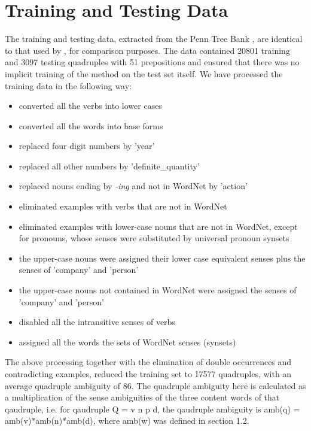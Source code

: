 \section{Training and Testing Data}

The training and testing data, extracted from the Penn Tree Bank \cite{MA93}, are identical to that used by \cite{RRR94}, \cite{CandB95} for comparison purposes. The data contained 20801 training and 3097 testing quadruples with 51 prepositions and ensured that there was no implicit training of the method on the test set itself. We have processed the training data in the following way:

\begin{itemize}
\item 
converted all the verbs into lower cases

\item 
converted all the words into base forms

\item 
replaced four digit numbers by {\sf 'year'}

\item 
replaced all other numbers by {\sf 'definite\_quantity'}

\item 
replaced nouns ending by {\it -ing} and not in WordNet by {\sf 'action'}

\item 
eliminated examples with verbs that are not in WordNet

\item 
eliminated examples with lower-case nouns that are not in WordNet, except for 
        pronouns, whose senses were substituted by universal pronoun synsets 

\item 
the upper-case nouns were assigned their lower case equivalent senses plus the
senses of {\sf 'company'} and {\sf 'person'}

\item 
the upper-case nouns not contained in WordNet were assigned the senses of 
{\sf 'company'} and {\sf 'person'}

\item 
disabled all the intransitive senses of verbs

\item 
assigned all the words the sets of WordNet senses (synsets)
\end{itemize}

The above processing together with the elimination of double occurrences and contradicting examples, reduced the training set to 17577 quadruples, with an average quadruple ambiguity of 86. The quadruple ambiguity here is calculated as a multiplication of the sense ambiguities of the three content words of that qaudruple, i.e. for qaudruple Q = v n p d, the qaudruple ambiguity is
amb(q) = amb(v)$*$amb(n)$*$amb(d),
where amb(w) was defined in section 1.2.

